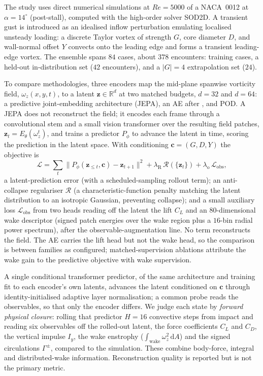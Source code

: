 \documentclass[10]{edrfcm}
\newcommand{\omegaz}{\omega_z}
\begin{document}
The study uses direct numerical simulations at $Re = 5000$ of a NACA~0012 at
$\alpha = 14^{\circ}$ (post-stall), computed with the high-order solver SOD2D.
A transient gust is introduced as an idealised inflow perturbation emulating
localised unsteady loading: a discrete Taylor vortex of strength $G$, core
diameter $D$, and wall-normal offset $Y$ convects onto the leading edge and forms
a transient leading-edge vortex. The ensemble spans $84$ cases, about $378$
encounters: training cases, a held-out in-distribution set ($42$ encounters), and
a $|G| = 4$ extrapolation set ($24$). 

To compare methodologies, three encoders map
the mid-plane spanwise vorticity field, $\omega_z(x,y,t)$, to a latent $\mathbf{z} \in \mathbb{R}^{d}$
at two matched budgets, $d = 32$ and $d = 64$: a predictive joint-embedding
architecture (JEPA), an AE after \cite{fukami2025}, and
POD. A JEPA does not reconstruct the field; it encodes each frame through a
convolutional stem and a small vision transformer over the resulting field
patches, $\mathbf{z}_t = E_\theta(\omegaz^{t})$, and trains a predictor $P_\phi$ to
advance the latent in time, scoring the prediction in the latent space. With
conditioning $\mathbf{c} = (G,D,Y)$ the objective is
\begin{equation}
\mathcal{L} = \sum_t \big\lVert P_\phi(\mathbf{z}_{\le t}, \mathbf{c})
- \mathbf{z}_{t+1} \big\rVert^2 + \lambda_{\mathrm{R}}\, \mathcal{R}(\{\mathbf{z}_t\})
+ \lambda_{\mathrm{o}}\, \mathcal{L}_{\mathrm{obs}},
\label{eq:loss}
\end{equation}
a latent-prediction error (with a scheduled-sampling rollout term); an
anti-collapse regulariser $\mathcal{R}$ (a characteristic-function penalty matching
the latent distribution to an isotropic Gaussian, preventing collapse); and a
small auxiliary loss
$\mathcal{L}_{\mathrm{obs}}$ from two heads reading off the latent the lift $C_L$
and an $80$-dimensional wake descriptor (signed patch energies over the wake
region plus a $16$-bin radial power spectrum), after the observable-augmentation
line. No term reconstructs the field. The AE carries the lift head but not the
wake head, so the comparison is between families as configured; matched-supervision
ablations attribute the wake gain to the predictive objective with wake supervision.

A single conditional transformer predictor, of the same architecture and training
fit to each encoder's own latents, advances the latent conditioned on $\mathbf{c}$
through identity-initialised adaptive layer normalisation; a common probe reads
the observables, so that only the encoder differs. We judge each state by
\emph{forward physical closure}: rolling that predictor $H = 16$ convective steps
from impact and reading six observables off the rolled-out latent, the force
coefficients $C_L$ and $C_D$, the vertical impulse $I_y$, the wake enstrophy
($\int_{\mathrm{wake}} \omegaz^{2}\,\mathrm{d}A$) and the signed circulations
$\Gamma^{\pm}$, compared to the simulation. These combine body-force, integral and
distributed-wake information. Reconstruction quality is reported but is not the
primary metric.
\end{document}
